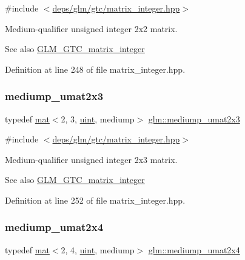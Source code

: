 {\ttfamily \#include $<$\hyperlink{matrix__integer_8hpp}{deps/glm/gtc/matrix\+\_\+integer.\+hpp}$>$}

Medium-\/qualifier unsigned integer 2x2 matrix. \begin{DoxySeeAlso}{See also}
\hyperlink{group__gtc__matrix__integer}{G\+L\+M\+\_\+\+G\+T\+C\+\_\+matrix\+\_\+integer} 
\end{DoxySeeAlso}


Definition at line 248 of file matrix\+\_\+integer.\+hpp.

\mbox{\label{group__gtc__matrix__integer_ga15d2790e10b27b145cd748abffde8968}} 
\subsubsection{\texorpdfstring{mediump\+\_\+umat2x3}{mediump\_umat2x3}}
{\footnotesize\ttfamily typedef \hyperlink{structglm_1_1mat}{mat}$<$2, 3, \hyperlink{group__core__precision_ga4fd29415871152bfb5abd588334147c8}{uint}, mediump$>$ \hyperlink{group__gtc__matrix__integer_ga15d2790e10b27b145cd748abffde8968}{glm\+::mediump\+\_\+umat2x3}}



{\ttfamily \#include $<$\hyperlink{matrix__integer_8hpp}{deps/glm/gtc/matrix\+\_\+integer.\+hpp}$>$}

Medium-\/qualifier unsigned integer 2x3 matrix. \begin{DoxySeeAlso}{See also}
\hyperlink{group__gtc__matrix__integer}{G\+L\+M\+\_\+\+G\+T\+C\+\_\+matrix\+\_\+integer} 
\end{DoxySeeAlso}


Definition at line 252 of file matrix\+\_\+integer.\+hpp.

\mbox{\label{group__gtc__matrix__integer_gae060f3b73abab278da912329a0a221bc}} 
\subsubsection{\texorpdfstring{mediump\+\_\+umat2x4}{mediump\_umat2x4}}
{\footnotesize\ttfamily typedef \hyperlink{structglm_1_1mat}{mat}$<$2, 4, \hyperlink{group__core__precision_ga4fd29415871152bfb5abd588334147c8}{uint}, mediump$>$ \hyperlink{group__gtc__matrix__integer_gae060f3b73abab278da912329a0a221bc}{glm\+::mediump\+\_\+umat2x4}}



